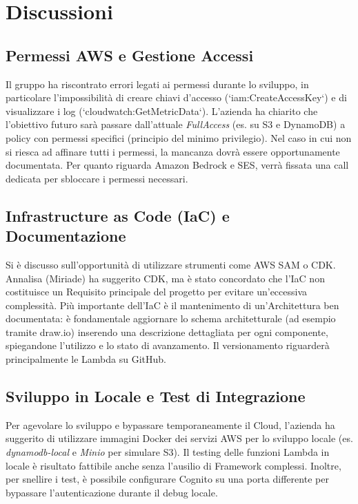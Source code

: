 \documentclass[a4paper,12pt]{article}
\begin{document}
\section{Discussioni}

\subsection{Permessi AWS e Gestione Accessi}
Il gruppo ha riscontrato errori legati ai permessi durante lo sviluppo, in particolare l'impossibilità di creare chiavi d'accesso (`iam:CreateAccessKey`) e di visualizzare i log (`cloudwatch:GetMetricData`). 
L'azienda ha chiarito che l'obiettivo futuro sarà passare dall'attuale \textit{FullAccess} (es. su S3 e DynamoDB) a policy con permessi specifici (principio del minimo privilegio). Nel caso in cui non si riesca ad affinare tutti i permessi, la mancanza dovrà essere opportunamente documentata. Per quanto riguarda Amazon Bedrock e SES, verrà fissata una call dedicata per sbloccare i permessi necessari.

\subsection{Infrastructure as Code (IaC) e Documentazione}
Si è discusso sull'opportunità di utilizzare strumenti come AWS SAM o CDK. Annalisa (Miriade) ha suggerito CDK, ma è stato concordato che l'IaC non costituisce un Requisito principale del progetto per evitare un'eccessiva complessità.
Più importante dell'IaC è il mantenimento di un'Architettura ben documentata: è fondamentale aggiornare lo schema architetturale (ad esempio tramite draw.io) inserendo una descrizione dettagliata per ogni componente, spiegandone l'utilizzo e lo stato di avanzamento. Il versionamento riguarderà principalmente le Lambda su GitHub.

\subsection{Sviluppo in Locale e Test di Integrazione}
Per agevolare lo sviluppo e bypassare temporaneamente il Cloud, l'azienda ha suggerito di utilizzare immagini Docker dei servizi AWS per lo sviluppo locale (es. \textit{dynamodb-local} e \textit{Minio} per simulare S3). 
Il testing delle funzioni Lambda in locale è risultato fattibile anche senza l'ausilio di Framework complessi. Inoltre, per snellire i test, è possibile configurare Cognito su una porta differente per bypassare l'autenticazione durante il debug locale.
\end{document}

